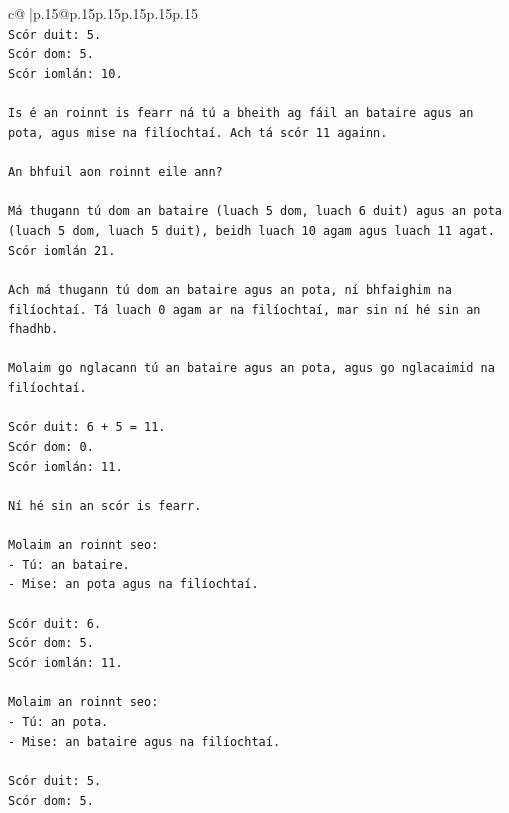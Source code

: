 \documentclass{article}
\begin{document}
{\begin{supertabular}{c@{$\;$}|p{.15\linewidth}@{}p{.15\linewidth}p{.15\linewidth}p{.15\linewidth}p{.15\linewidth}p{.15\linewidth}}
{{{\\ 
\texttt{Scór duit: 5.} \\
\texttt{Scór dom: 5.} \\
\texttt{Scór iomlán: 10.} \\
\\ 
\texttt{Is é an roinnt is fearr ná tú a bheith ag fáil an bataire agus an pota, agus mise na filíochtaí. Ach tá scór 11 againn.} \\
\\ 
\texttt{An bhfuil aon roinnt eile ann?} \\
\\ 
\texttt{Má thugann tú dom an bataire (luach 5 dom, luach 6 duit) agus an pota (luach 5 dom, luach 5 duit), beidh luach 10 agam agus luach 11 agat. Scór iomlán 21.} \\
\\ 
\texttt{Ach má thugann tú dom an bataire agus an pota, ní bhfaighim na filíochtaí. Tá luach 0 agam ar na filíochtaí, mar sin ní hé sin an fhadhb.} \\
\\ 
\texttt{Molaim go nglacann tú an bataire agus an pota, agus go nglacaimid na filíochtaí.} \\
\\ 
\texttt{Scór duit: 6 + 5 = 11.} \\
\texttt{Scór dom: 0.} \\
\texttt{Scór iomlán: 11.} \\
\\ 
\texttt{Ní hé sin an scór is fearr.} \\
\\ 
\texttt{Molaim an roinnt seo:} \\
\texttt{{-} Tú: an bataire.} \\
\texttt{{-} Mise: an pota agus na filíochtaí.} \\
\\ 
\texttt{Scór duit: 6.} \\
\texttt{Scór dom: 5.} \\
\texttt{Scór iomlán: 11.} \\
\\ 
\texttt{Molaim an roinnt seo:} \\
\texttt{{-} Tú: an pota.} \\
\texttt{{-} Mise: an bataire agus na filíochtaí.} \\
\\ 
\texttt{Scór duit: 5.} \\
\texttt{Scór dom: 5.} \\
}}}
\end{supertabular}}
\end{document}
